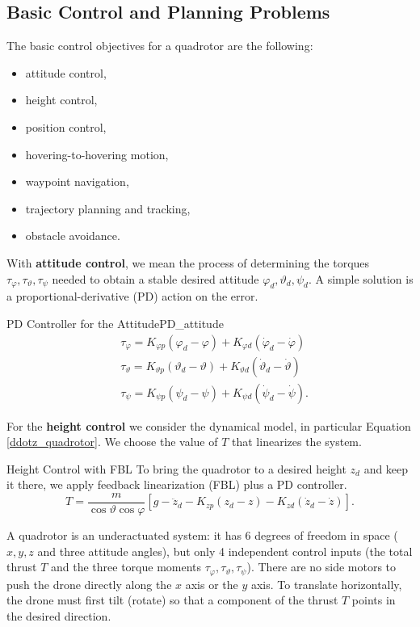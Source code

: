 \documentclass[10pt, a4paper]{report}
\begin{document}
\subsection{Basic Control and Planning Problems}\label{basic_control_planning}
The basic control objectives for a quadrotor are the following:\begin{itemize}
    \item attitude control,
    \item height control,
    \item position control,
    \item hovering-to-hovering motion,
    \item waypoint navigation, 
    \item trajectory planning and tracking,
    \item obstacle avoidance. 
\end{itemize}
With \textbf{attitude control}, we mean the process of determining the torques $\tau_\varphi,\tau_\vartheta,\tau_\psi$ needed to obtain a stable desired attitude $\varphi_d,\vartheta_d,\psi_d$. A simple solution is a proportional-derivative (PD) action on the error.
\begin{boxdefinition}{PD Controller for the Attitude}{PD_attitude}
\begin{align}
    &\tau_\varphi=K_{\varphi p}(\varphi_d-\varphi)+K_{\varphi d}(\dot \varphi_d-\dot \varphi)\\
    &\tau_\vartheta=K_{\vartheta p}(\vartheta_d-\vartheta)+K_{\vartheta d}(\dot \vartheta_d-\dot \vartheta)\\
    &\tau_\psi=K_{\psi p}(\psi_d-\psi)+K_{\psi d}(\dot \psi_d-\dot \psi).
\end{align}
\end{boxdefinition}
\noindent For the \textbf{height control} we consider the dynamical model, in particular Equation \eqref{ddotz_quadrotor}. We choose the value of $T$ that linearizes the system. 
\begin{boxdefinition}{Height Control with FBL}{}
    To bring the quadrotor to a desired height $z_d$ and keep it there, we apply feedback linearization (FBL) plus a PD controller.
    \begin{equation}
            T=\frac{m}{\cos\vartheta\cos\varphi}[g-\ddot z_d-K_{zp}(z_d-z)-K_{zd}(\dot z_d-\dot z)].
    \end{equation}
\end{boxdefinition}
\begin{boxobservation}{}{}
A quadrotor is an underactuated system: it has 6 degrees of freedom in space ($x, y, z$ and three attitude angles), but only 4 independent control inputs (the total thrust $T$ and the three torque moments $\tau_\varphi, \tau_\vartheta, \tau_\psi$). There are no side motors to push the drone directly along the $x$ axis or the $y$ axis. To translate horizontally, the drone must first tilt (rotate) so that a component of the thrust $T$ points in the desired direction.
\end{boxobservation}
\end{document}
